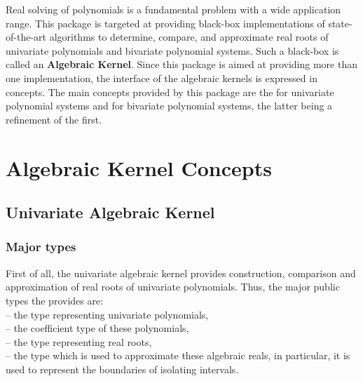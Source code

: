 
Real solving of polynomials is a fundamental problem with a wide application range. 
This package is targeted at providing black-box implementations of state-of-the-art 
algorithms to determine, compare, and approximate real roots of univariate polynomials
and bivariate polynomial systems. Such a black-box is called an {\bf Algebraic Kernel}. 
Since this package is aimed at providing more than one implementation, the interface of 
the algebraic kernels is expressed in concepts. The main concepts provided by this package are the 
 for univariate polynomial systems and  
for bivariate polynomial systems, the latter being a refinement of the first. 





\section{Algebraic Kernel Concepts}
\subsection{Univariate Algebraic Kernel}
\subsubsection{Major types}
First of all, the univariate algebraic kernel provides construction, comparison and 
approximation of real roots of univariate polynomials. 
Thus, the major public types the  provides are: \\
 -- the type representing univariate polynomials,\\
 -- the coefficient type of these polynomials, \\
 -- the type representing real roots,\\
 -- the type which is used to approximate these algebraic reals, 
in particular, it is used to represent the boundaries of isolating intervals. \\

